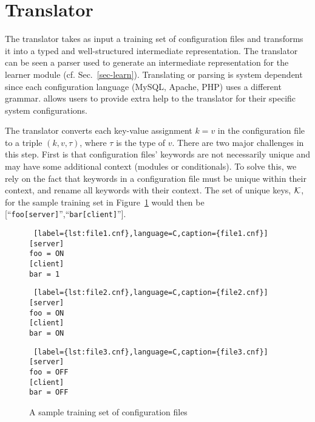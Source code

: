 
\section{Translator}
\label{sec:trans}

The translator takes as input a training set of configuration files and transforms it into a typed and well-structured intermediate representation.
The translator can be seen a parser used to generate an intermediate representation for the learner module (cf. Sec.~\ref{sec-learn}).
Translating or parsing is system dependent since each configuration language (MySQL, Apache, PHP) uses a different grammar.
\app allows users to provide extra help to the translator for their specific system configurations.

The translator converts each key-value assignment $k=v$ in the configuration file to a triple $(k, v, \tau)$, where $\tau$ is the type of $v$. 
There are two major challenges in this step.
First is that configuration files' keywords are not necessarily unique and may have some additional context (modules or conditionals).
To solve this, we rely on the fact that keywords in a configuration file must be unique within their context, and rename all keywords with their context.
The set of unique keys, $\mathcal{K}$, for the sample training set in Figure~\ref{fig:tset} would then be [``{\tt foo[server]}'',``{\tt bar[client]}''].

{
\setlength{\belowcaptionskip}{-15pt}
\begin{figure}[!htb]
    \centering
    \begin{minipage}{.25\textwidth}
	\begin{lstlisting} [label={lst:file1.cnf},language=C,caption={file1.cnf}]
[server]
foo = ON
[client]
bar = 1
	\end{lstlisting}
    \end{minipage}%
    \hspace{1cm}
    \begin{minipage}{0.25\textwidth}
	\begin{lstlisting} [label={lst:file2.cnf},language=C,caption={file2.cnf}]
[server]
foo = ON
[client]
bar = ON
	\end{lstlisting}
    \end{minipage}
    \hspace{1cm}
    \begin{minipage}{0.25\textwidth}
	\begin{lstlisting} [label={lst:file3.cnf},language=C,caption={file3.cnf}]
[server]
foo = OFF
[client]
bar = OFF
	\end{lstlisting}
    \end{minipage}
    \caption{A sample training set of configuration files}
    \label{fig:tset}
\end{figure}
}

